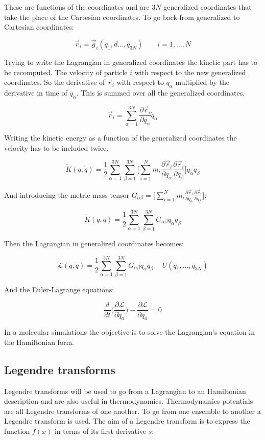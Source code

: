 	These are functions of the coordinates and are $3N$ generalized coordinates that take the place of the Cartesian coordinates.
	To go back from generalized to Cartesian coordinates:

	$$\vec{r}_i =\vec{g}_i(q_1, d\dots, q_{3N})\qquad i =1, \dots, N$$

	Trying to write the Lagrangian in generalized coordinates the kinetic part has to be recomputed.
	The velocity of particle $i$ with respect to the new generalized coordinates.
	So the derivative of $\vec{r}_i$ with respect to $q_\alpha$ multiplied by the derivative in time of $q_\alpha$.
	This is summed over all the generalized coordinates.

	$$\dot{\vec{r}}_i = \sum\limits_{\alpha=1}^{3N}\frac{\partial \vec{r}_i}{\partial q_\alpha}\dot{q}_\alpha$$

	Writing the kinetic energy as a function of the generalized coordinates the velocity has to be included twice.

	$$\tilde{K}(q, \dot{q}) = \frac{1}{2}\sum\limits_{\alpha=1}^{3N}\sum\limits_{\beta=1}^{3N}\biggl[\sum\limits_{i=1}^Nm_i\frac{\partial\vec{r}_i}{\partial q_\alpha}\frac{\partial\vec{r}_i}{\partial q_\beta}\biggr]\dot{q}_\alpha\dot{q}_\beta$$

	And introducing the metric mass tensor $G_{\alpha\beta} = \biggl[\sum\limits_{i=1}^Nm_i\frac{\partial\vec{r}_i}{\partial q_\alpha}\frac{\partial\vec{r}_i}{\partial q_\beta}\biggr]$:

	$$\tilde{K}(q, \dot{q}) = \frac{1}{2}\sum\limits_{\alpha=1}^{3N}\sum\limits_{\beta=1}^{3N}G_{\alpha\beta}\dot{q}_\alpha\dot{q}_\beta$$

	Then the Lagrangian in generalized coordinates becomes:

	$$\mathcal{L}(q, \dot{q}) =\frac{1}{2}\sum\limits_{\alpha=1}^{3N}\sum\limits_{\beta=1}^{3N}G_{\alpha\beta}\dot{q}_\alpha\dot{q}_\beta - U(q_1, \dots, q_{3N})$$

	And the Euler-Lagrange equations:

	$$\frac{d}{dt}\biggl(\frac{\partial\mathcal{L}}{\partial\dot{q}_\alpha}\biggr) -\frac{\partial\mathcal{L}}{\partial q_\alpha} = 0$$

	In a molecular simulations the objective is to solve the Lagrangian's equation in the Hamiltonian form.

	\subsection{Legendre transforms}
	Legendre transforms will be used to go from a Lagrangian to an Hamiltonian description and are also useful in thermodynamics.
	Thermodynamics potentials are all Legendre transforms of one another.
	To go from one ensemble to another a Legendre transform is used.
	The aim of a Legendre transform is to express the function $f(x)$ in terms of its first derivative $s$:

